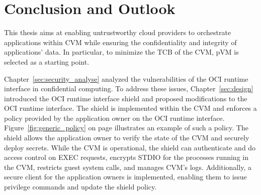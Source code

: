 \chapter{Conclusion and Outlook}
\label{sec:conclusion}





This thesis aims at enabling untrustworthy cloud providers to orchestrate applications within \acrshort{CVM} while ensuring the confidentiality and integrity of applications' data. In particular, to minimize the \acrshort{TCB} of the CVM, \acrshort{pVM} is selected as a starting point.
 
Chapter~\ref{sec:security_analyse} analyzed the vulnerabilities of the OCI runtime interface in confidential computing. To address these issues, Chapter~\ref{sec:design} introduced the OCI runtime interface shield and proposed modifications to the OCI runtime interface. The shield is implemented 
within the \acrshort{CVM} and enforces a policy provided by the application owner on the OCI runtime interface. Figure~\ref{fig:generic_policy} on page \pageref{fig:generic_policy} illustrates an example of such a policy. The shield allows the application owner to verify the state of the \acrshort{CVM}
and securely deploy secrets. While the \acrshort{CVM} is operational, the shield can authenticate and do access control on EXEC requests, encrypts STDIO for the processes running in the \acrshort{CVM}, restricts guest system calls, and manages \acrshort{CVM}'s logs. Additionally, a 
secure client for the application owners is implemented, enabling them to issue privilege commands and update the shield policy.
 
